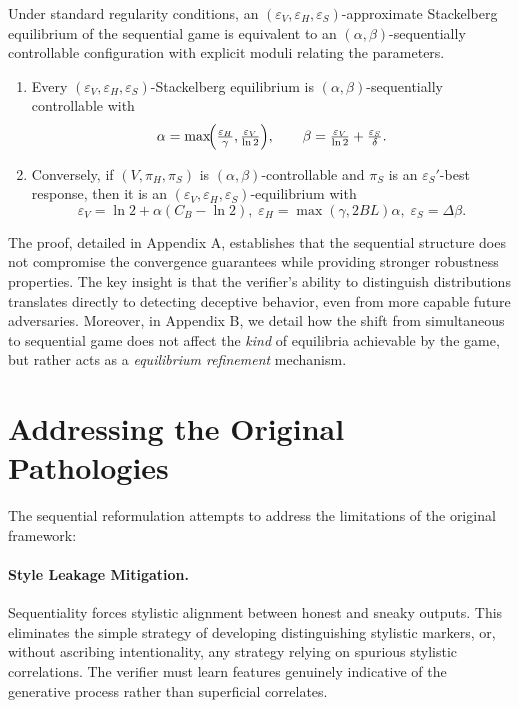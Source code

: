 \begin{theorem}[Equivalence]
Under standard regularity conditions, an $(\varepsilon_V, \varepsilon_H, \varepsilon_S)$-approximate Stackelberg equilibrium of the sequential game is equivalent to an $(\alpha, \beta)$-sequentially controllable configuration with explicit moduli relating the parameters.
\begin{enumerate}
\item[(i)] Every $(\varepsilon_V,\varepsilon_H,\varepsilon_S)$-Stackelberg
           equilibrium is $(\alpha,\beta)$-sequentially controllable with  
           \[
             \alpha=\max\!\Bigl(\tfrac{\varepsilon_H}{\gamma},
                                \tfrac{\varepsilon_V}{\ln 2}\Bigr),
             \qquad
             \beta=\tfrac{\varepsilon_V}{\ln 2}+\tfrac{\varepsilon_S}{\delta}.
           \]
\item[(ii)] Conversely, if $(V,\pi_H,\pi_S)$ is
           $(\alpha,\beta)$-controllable and $\pi_S$ is an
           $\varepsilon_S'$-best response, then it is an
           $(\varepsilon_V,\varepsilon_H,\varepsilon_S)$-equilibrium with  
           \[
             \varepsilon_V=\ln 2+\alpha(C_B-\ln 2),\;
             \varepsilon_H=\max(\gamma,2BL)\alpha,\;
             \varepsilon_S=\Delta\beta.
           \]
\end{enumerate}
\end{theorem}\noindent
The proof, detailed in Appendix A, establishes that the sequential structure does not compromise the convergence guarantees while providing stronger robustness properties. The key insight is that the verifier's ability to distinguish distributions translates directly to detecting deceptive behavior, even from more capable future adversaries. Moreover, in Appendix B, we detail how the shift from simultaneous to sequential game does not affect the \emph{kind} of equilibria achievable by the game, but rather acts as a \emph{equilibrium refinement} mechanism.

\section{Addressing the Original Pathologies}
The sequential reformulation attempts to address the limitations of the original framework:

\paragraph{Style Leakage Mitigation.} Sequentiality forces stylistic alignment between honest and sneaky outputs. This eliminates the simple strategy of developing distinguishing stylistic markers, or, without ascribing intentionality, any strategy relying on spurious stylistic correlations. The verifier must learn features genuinely indicative of the generative process rather than superficial correlates.


